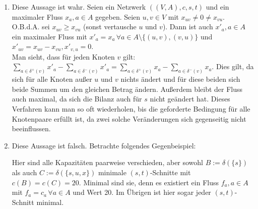 \documentclass[a4paper,12pt,german]{scrartcl}
\begin{document}
\begin{enumerate}
  \item Diese Aussage ist wahr. Seien ein Netzwerk $((V,A),c,s,t)$ und ein maximaler Fluss $x_a,a\in A$ gegeben. Seien $u,v\in V$ mit $x_{uv}\neq0\neq x_{vu}$. O.B.d.A. sei $x_{uv}\geq x_{vu}$ (sonst vertausche $u$ und $v$). Dann ist auch $x'_{a},a\in A$ ein maximaler Fluss mit $x'_a=x_a\,\forall a\in A\setminus\{(u,v),(v,u)\}$ und $x'_{uv}=x_{uv}-x_{vu},x'_{v,u}=0$.\\
  Man sieht, dass für jeden Knoten $v$ gilt: $\sum\limits_{a\in\delta^+(v)}x'_a-\sum\limits_{a\in\delta^-(v)}x'_a=\sum\limits_{a\in\delta^+(v)}x_a-\sum\limits_{a\in\delta^-(v)}x_a$. Dies gilt, da sich für alle Knoten außer $u$ und $v$ nichts ändert und für diese beiden sich beide Summen um den gleichen Betrag ändern. Außerdem bleibt der Fluss auch maximal, da sich die Bilanz auch für $s$ nicht geändert hat. Dieses Verfahren kann man so oft wiederholen, bis die geforderte Bedingung für alle Knotenpaare erfüllt ist, da zwei solche Veränderungen sich gegenseitig nicht beeinflussen.
  \item Diese Aussage ist falsch. Betrachte folgendes Gegenbeispiel:
    \begin{center}
    \end{center}
    Hier sind alle Kapazitäten paarweise verschieden, aber sowohl $B:=\delta(\{s\})$ als auch $C:=\delta(\{s,u,x\})$ minimale $(s,t)$-Schnitte mit $c(B)=c(C)=20$. Minimal sind sie, denn es existiert ein Fluss $f_a,a\in A$ mit $f_a=c_a\,\forall a\in A$ und Wert 20. Im Übrigen ist hier sogar jeder $(s,t)$-Schnitt minimal.
    

\end{enumerate}
\end{document}
